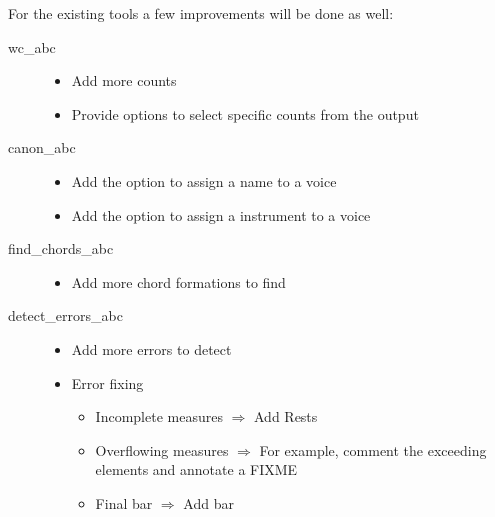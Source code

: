 For the existing tools a few improvements will be done as well:

\begin{description}
  \item[wc\_abc] \hfill
    \begin{itemize}
      \item Add more counts
      \item Provide options to select specific counts from the output
    \end{itemize}
  \item[canon\_abc] \hfill
    \begin{itemize}
      \item Add the option to assign a name to a voice
      \item Add the option to assign a \midi{} instrument to a voice
    \end{itemize}
  \item[find\_chords\_abc] \hfill
    \begin{itemize}
      \item Add more chord formations to find
    \end{itemize}
  \item[detect\_errors\_abc] \hfill
    \begin{itemize}
      \item Add more errors to detect
      \item Error fixing
        \begin{itemize}
          \item Incomplete measures $\Rightarrow$ Add Rests
          \item Overflowing measures $\Rightarrow$ For example, comment the exceeding elements and
          annotate a FIXME
          \item Final bar $\Rightarrow$ Add bar
        \end{itemize}
    \end{itemize}
\end{description}
